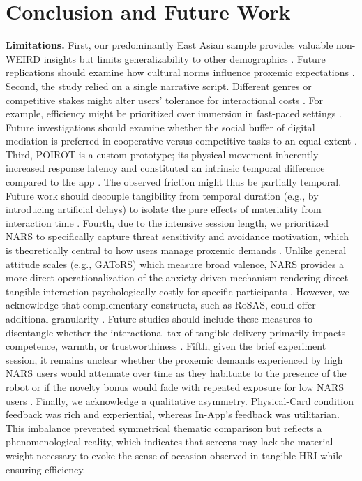 \documentclass[sigconf,screen]{acmart-tagged}
\newcommand{\rev}[1]{#1}
\begin{document}
\section{Conclusion and Future Work}
\noindent \rev{\textbf{Limitations.} First, our predominantly East Asian sample provides valuable non-WEIRD insights but limits generalizability to other demographics \cite{lim2021social, seaborn2023not, van2022weird, leichtmann2022crisis}. Future replications should examine how cultural norms influence proxemic expectations \cite{andrist2015effects, winkle2022norm, komatsu2021blaming, baxter2016characterising}. Second, the study relied on a single narrative script. Different genres or competitive stakes might alter users' tolerance for interactional costs \cite{bowman2025transformative, lopes2025closing}. For example, efficiency might be prioritized over immersion in fast-paced settings \cite{yang2021competitive, zorner2021immersive, ng2024role}. Future investigations should examine whether the social buffer of digital mediation is preferred in cooperative versus competitive tasks to an equal extent \cite{javed2024modeling, weisswange2023could}. Third, POIROT is a custom prototype; its physical movement inherently increased response latency and constituted an intrinsic temporal difference compared to the app \cite{liu2023defining, stedtler2024there}. The observed friction might thus be partially temporal. Future work should decouple tangibility from temporal duration (e.g., by introducing artificial delays) to isolate the pure effects of materiality from interaction time \cite{kappler2023optimizing, eizicovits2018robotic}. Fourth, due to the intensive session length, we prioritized NARS to specifically capture threat sensitivity and avoidance motivation, which is theoretically central to how users manage proxemic demands \cite{nomura2006measurement, nomura2007experimental, miller2021more}. Unlike general attitude scales (e.g., GAToRS) which measure broad valence, NARS provides a more direct operationalization of the anxiety-driven mechanism rendering direct tangible interaction psychologically costly for specific participants \cite{koverola2022general, nomura2007experimental}. However, we acknowledge that complementary constructs, such as RoSAS, could offer additional granularity \cite{carpinella2017robotic}. Future studies should include these measures to disentangle whether the interactional tax of tangible delivery primarily impacts competence, warmth, or trustworthiness \cite{pan2019fast, miller2021more}. Fifth, given the brief experiment session, it remains unclear whether the proxemic demands experienced by high NARS users would attenuate over time as they habituate to the presence of the robot or if the novelty bonus would fade with repeated exposure for low NARS users \cite{laban2022user, rakhymbayeva2021long, stower2021meta, ligthart2022memory}. Finally, we acknowledge a qualitative asymmetry. Physical-Card condition feedback was rich and experiential, whereas In-App's feedback was utilitarian. This imbalance prevented symmetrical thematic comparison but reflects a phenomenological reality, which indicates that screens may lack the material weight necessary to evoke the sense of occasion observed in tangible HRI while ensuring efficiency.}
\end{document}
